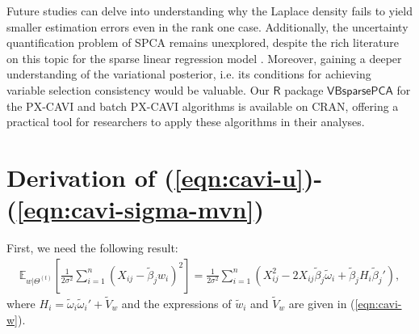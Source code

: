 \documentclass[pdftex, noinfoline, letter]{imsart}
\theoremstyle{plain}
\begin{document}
Future studies can delve into understanding why the Laplace density fails to yield smaller estimation errors even in the rank one case. Additionally, the uncertainty quantification problem of SPCA remains unexplored, despite the rich literature on this topic for the sparse linear regression model \citep[see][]{vdP17, belitser20, cast20b, martin20}. Moreover, gaining a deeper understanding of the variational posterior, i.e. its conditions for achieving variable selection consistency would be valuable.
Our $\mathsf{R}$ package $\mathsf{VBsparsePCA}$ for the PX-CAVI and batch PX-CAVI algorithms is available on CRAN, offering a practical tool for researchers to apply these algorithms in their analyses.

\appendix

\section{Derivation of (\ref{eqn:cavi-u})-(\ref{eqn:cavi-sigma-mvn})}
\label{derive-cavi}

First, we need the following result:
\begin{align}
\label{pf-cavi-derv-1}
    \mathbb{E}_{w|\Theta^{(t)}} 
    \left[
        \frac{1}{2\sigma^2} \sum_{i=1}^n (X_{ij} - \widetilde  \beta_j w_i)^2 
    \right]
    = 
    \frac{1}{2\sigma^2}
        \sum_{i=1}^n \left(
            X_{ij}^2 - 2X_{ij} \widetilde  \beta_j \widetilde  \omega_i + \widetilde  \beta_j H_i \widetilde  \beta_j'
        \right),
\end{align}
where 
$H_i = \widetilde  \omega_i\widetilde  \omega_i' + \widetilde  V_w$ and the expressions of
$\widetilde  w_i$ and $\widetilde  V_w$ are given in (\ref{eqn:cavi-w}).
\end{document}
